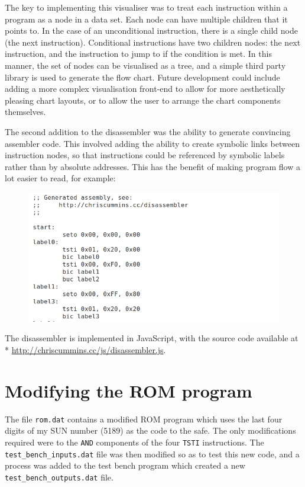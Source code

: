 \documentclass[12pt,a4paper]{article}
\begin{document}
The key to implementing this visualiser was to treat each instruction
within a program as a node in a data set. Each node can have multiple
children that it points to. In the case of an unconditional
instruction, there is a single child node (the next
instruction). Conditional instructions have two children nodes: the
next instruction, and the instruction to jump to if the condition is
met. In this manner, the set of nodes can be visualised as a tree, and
a simple third party library is used to generate the flow
chart. Future development could include adding a more complex
visualisation front-end to allow for more aesthetically pleasing chart
layouts, or to allow the user to arrange the chart components
themselves.

The second addition to the disassembler was the ability to generate
convincing assembler code. This involved adding the ability to create
symbolic links between instruction nodes, so that instructions could
be referenced by symbolic labels rather than by absolute
addresses. This has the benefit of making program flow a lot easier to
read, for example:

\begin{figure}[H]
  \centering
  \includegraphics[width=6in]{assets/assembly.png}
\end{figure}

The disassembler is
implemented in JavaScript, with the source code available at\\*
\url{http://chriscummins.cc/js/disassembler.js}.

\section{Modifying the ROM program}

The file \texttt{rom.dat} contains a modified ROM program which uses
the last four digits of my SUN number (5189) as the code to the
safe. The only modifications required were to the \texttt{AND}
components of the four \texttt{TSTI} instructions. The
\texttt{test\_bench\_inputs.dat} file was then modified so as to test
this new code, and a process was added to the test bench program which
created a new \texttt{test\_bench\_outputs.dat} file.
\end{document}
